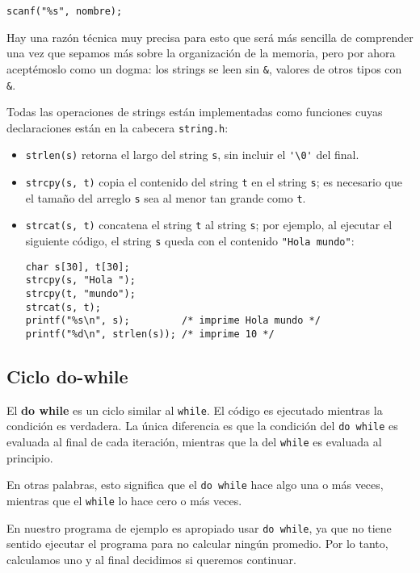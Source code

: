 \begin{lstlisting}
scanf("%s", nombre);
\end{lstlisting}

Hay una razón técnica muy precisa para esto que será más sencilla de
comprender una vez que sepamos más sobre la organización de la memoria,
pero por ahora aceptémoslo como un dogma: los strings se leen sin
\lstinline!&!, valores de otros tipos con \lstinline!&!.

Todas las operaciones de strings están implementadas como funciones
cuyas declaraciones están en la cabecera \lstinline!string.h!:

\begin{itemize}
\item
  \lstinline!strlen(s)! retorna el largo del string \lstinline!s!, sin
  incluir el \lstinline!'\0'! del final.
\item
  \lstinline!strcpy(s, t)! copia el contenido del string \lstinline!t!
  en el string \lstinline!s!; es necesario que el tamaño del arreglo
  \lstinline!s! sea al menor tan grande como \lstinline!t!.
\item
  \lstinline!strcat(s, t)! concatena el string \lstinline!t! al string
  \lstinline!s!; por ejemplo, al ejecutar el siguiente código, el string
  \lstinline!s! queda con el contenido \lstinline!"Hola mundo"!:

\begin{lstlisting}
char s[30], t[30];
strcpy(s, "Hola ");
strcpy(t, "mundo");
strcat(s, t);
printf("%s\n", s);         /* imprime Hola mundo */
printf("%d\n", strlen(s)); /* imprime 10 */
\end{lstlisting}
\end{itemize}

\subsection{Ciclo do-while}

El \textbf{do while} es un ciclo similar al \lstinline!while!. El código
es ejecutado mientras la condición es verdadera. La única diferencia es
que la condición del \lstinline!do while! es evaluada al final de cada
iteración, mientras que la del \lstinline!while! es evaluada al
principio.

En otras palabras, esto significa que el \lstinline!do while! hace algo
una o más veces, mientras que el \lstinline!while! lo hace cero o más
veces.

En nuestro programa de ejemplo es apropiado usar \lstinline!do while!,
ya que no tiene sentido ejecutar el programa para no calcular ningún
promedio. Por lo tanto, calculamos uno y al final decidimos si queremos
continuar.

